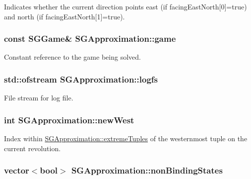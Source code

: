 Indicates whether the current direction points east (if facing\+East\+North\mbox{[}0\mbox{]}=true) and north (if facing\+East\+North\mbox{[}1\mbox{]}=true). \hypertarget{class_s_g_approximation_a3244a3d7de5f2b909d438f5b4ab337ee}{
\subsubsection[{game}]{\setlength{\rightskip}{0pt plus 5cm}const {\bf S\+G\+Game}\& S\+G\+Approximation\+::game\hspace{0.3cm}{\ttfamily [private]}}}\label{class_s_g_approximation_a3244a3d7de5f2b909d438f5b4ab337ee}
Constant reference to the game being solved. \hypertarget{class_s_g_approximation_a3c938c255cddce7cc0483e223bf09b65}{
\subsubsection[{logfs}]{\setlength{\rightskip}{0pt plus 5cm}std\+::ofstream S\+G\+Approximation\+::logfs\hspace{0.3cm}{\ttfamily [private]}}}\label{class_s_g_approximation_a3c938c255cddce7cc0483e223bf09b65}
File stream for log file. \hypertarget{class_s_g_approximation_a82f819dc38d837e69d60225823a64671}{
\subsubsection[{new\+West}]{\setlength{\rightskip}{0pt plus 5cm}int S\+G\+Approximation\+::new\+West\hspace{0.3cm}{\ttfamily [private]}}}\label{class_s_g_approximation_a82f819dc38d837e69d60225823a64671}
Index within \hyperlink{class_s_g_approximation_ac55fd302328ae8fbe4d1f8cf24a7ba32}{S\+G\+Approximation\+::extreme\+Tuples} of the westernmost tuple on the current revolution. \hypertarget{class_s_g_approximation_a42b53c0e82dfa456f3153bcc79185dcd}{
\subsubsection[{non\+Binding\+States}]{\setlength{\rightskip}{0pt plus 5cm}vector$<$bool$>$ S\+G\+Approximation\+::non\+Binding\+States\hspace{0.3cm}{\ttfamily [private]}}}\label{class_s_g_approximation_a42b53c0e82dfa456f3153bcc79185dcd}
